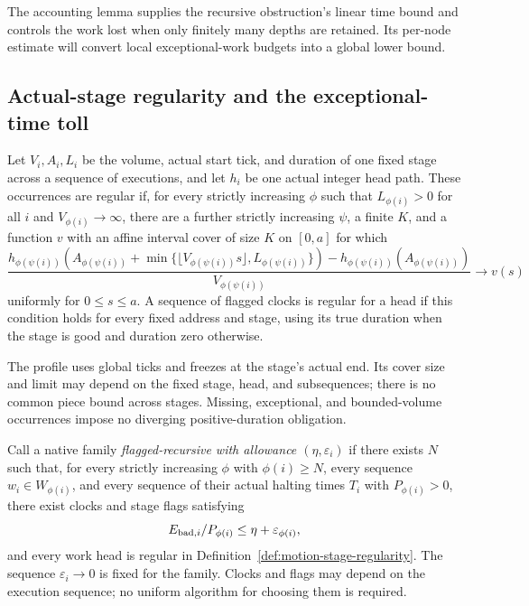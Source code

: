 The accounting lemma supplies the recursive obstruction's linear time bound
and controls the work lost when only finitely many depths are retained.  Its
per-node estimate will convert local exceptional-work budgets into a global
lower bound.

\subsection{Actual-stage regularity and the exceptional-time toll}

\begin{definition}
\label{def:motion-stage-regularity}
Let $V_i,A_i,L_i$ be the volume, actual start tick, and duration of one fixed
stage across a sequence of executions, and let $h_i$ be one actual integer
head path.  These occurrences are regular if, for every strictly increasing
$\phi$ such that $L_{\phi(i)}>0$ for all $i$ and
$V_{\phi(i)}\to\infty$, there are a further strictly increasing $\psi$, a
finite $K$, and a function $v$ with an affine interval cover of size $K$ on
$[0,a]$ for which
\begin{equation}
\label{eq:motion-local-profile}
 \frac{h_{\phi(\psi(i))}\!\left(A_{\phi(\psi(i))}
       +\min\{\lfloor V_{\phi(\psi(i))}s\rfloor,L_{\phi(\psi(i))}\}\right)
       -h_{\phi(\psi(i))}(A_{\phi(\psi(i))})}
      {V_{\phi(\psi(i))}}
 \longrightarrow v(s)
\end{equation}
uniformly for $0\le s\le a$.  A sequence of flagged clocks is regular for a
head if this condition holds for every fixed address and stage, using its
true duration when the stage is good and duration zero otherwise.
\end{definition}

The profile uses global ticks and freezes at the stage's actual end.  Its
cover size and limit may depend on the fixed stage, head, and subsequences;
there is no common piece bound across stages.  Missing, exceptional, and
bounded-volume occurrences impose no diverging positive-duration obligation.

Call a native family
\emph{flagged-recursive with allowance $(\eta,\varepsilon_i)$} if there exists
$N$ such that, for every strictly increasing $\phi$ with $\phi(i)\ge N$, every
sequence $w_i\in W_{\phi(i)}$, and every sequence of their actual halting
times $T_i$ with $P_{\phi(i)}>0$, there exist clocks and stage flags satisfying
\[
 E_{{\rm bad},i}/P_{\phi(i)}\le\eta+\varepsilon_{\phi(i)},
\]
and every work head is regular in Definition~\ref{def:motion-stage-regularity}.
The sequence $\varepsilon_i\to0$ is fixed for the family.  Clocks and flags
may depend on the execution sequence; no uniform algorithm for choosing them
is required.

